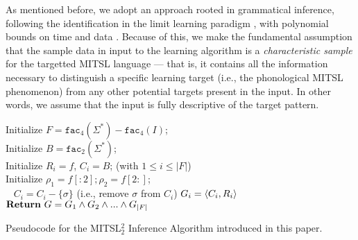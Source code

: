 \documentclass[11pt,a4paper]{article}
\newcommand{\facn}[1]{\ensuremath{\texttt{fac}_{#1}}}
\begin{document}
As mentioned before, we adopt an approach rooted in grammatical inference, following the identification in the limit learning paradigm \cite{gold1967language}, with polynomial bounds on time and data \cite{de2010grammatical}.\@
Because of this, we make the fundamental assumption that the sample data in input to the learning algorithm is a \emph{characteristic sample} for the targetted MITSL  language --- that is, it contains all the information necessary to distinguish a specific learning target (i.e., the phonological MITSL phenomenon) from any other potential targets present in the input.
In other words, we assume that the input is fully descriptive of the target pattern.


\begin{algorithm}[!ht]
    Initialize $F=\facn{4}(\Sigma^*)-\facn{4}(I)$; \\
    Initialize $B=\facn{2}(\Sigma^*)$; \\
        	{
            Initialize $R_i=f$, $C_i=B$; (with $1 \leq i \leq  |F|$) \\
             Initialize $\rho_1 = f[:2] ;\rho_2 = f[2:]$;\\
            	{
                	~
    					{$C_i=C_i-\{\sigma\}$ (i.e., remove $\sigma$ from $C_i$)}}
					$G_i=\langle{C_i,R_i}\rangle$
                }
            $\mathbf{Return}\textnormal{ }G=G_1\wedge G_2\wedge ... \wedge G_{|F|}$
            \medskip
	\caption{Pseudocode for the MITSL$^2_2$ Inference Algorithm introduced in this paper.}
\end{algorithm}
\end{document}
